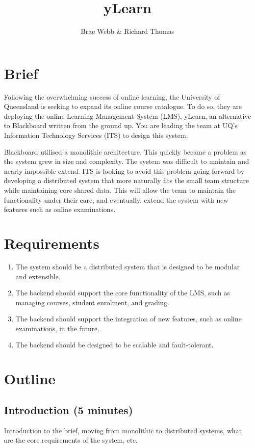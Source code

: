 \documentclass{csse4400}
\title{yLearn}
\author{Brae Webb \& Richard Thomas}
\date{\week[tutorial]{4}}
\begin{document}
\maketitle

\section{Brief}

Following the overwhelming success of online learning,
the University of Queensland is seeking to expand its online course catalogue.
To do so, they are deploying the online Learning Management System (LMS),
yLearn, an alternative to Blackboard written from the ground up.
You are leading the team at UQ's Information Technology Services (ITS) to design this system.

Blackboard utilised a monolithic architecture.
This quickly became a problem as the system grew in size and complexity.
The system was difficult to maintain and nearly impossible extend.
ITS is looking to avoid this problem going forward
by developing a distributed system that more naturally fits the small team structure while maintaining core shared data.
This will allow the team to maintain the functionality under their care, and eventually,
extend the system with new features such as online examinations.

\section{Requirements}

\begin{enumerate}
\item The system should be a distributed system that is designed to be modular and extensible.
\item The backend should support the core functionality of the LMS, such as managing courses, student enrolment, and grading.
\item The backend should support the integration of new features, such as online examinations, in the future.
\item The backend should be designed to be scalable and fault-tolerant.
\end{enumerate}

\section{Outline}

\subsection*{Introduction (5 minutes)}
Introduction to the brief,
moving from monolithic to distributed systems,
what are the core requirements of the system,
etc.
\end{document}
